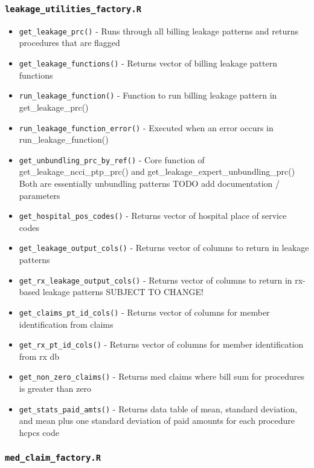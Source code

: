 \documentclass[
]{book}
\providecommand{\tightlist}{%
  \setlength{\itemsep}{0pt}\setlength{\parskip}{0pt}}
\begin{document}
\hypertarget{leakage_utilities_factory.r}{%
\subsubsection{\texorpdfstring{\texttt{leakage\_utilities\_factory.R}}{leakage\_utilities\_factory.R}}\label{leakage_utilities_factory.r}}

\begin{itemize}
\tightlist
\item
  \texttt{get\_leakage\_prc()} - Runs through all billing leakage patterns and returns procedures that are flagged
\item
  \texttt{get\_leakage\_functions()} - Returns vector of billing leakage pattern functions
\item
  \texttt{run\_leakage\_function()} - Function to run billing leakage pattern in get\_leakage\_prc()
\item
  \texttt{run\_leakage\_function\_error()} - Executed when an error occurs in run\_leakage\_function()
\item
  \texttt{get\_unbundling\_prc\_by\_ref()} - Core function of get\_leakage\_ncci\_ptp\_prc() and get\_leakage\_expert\_unbundling\_prc() Both are essentially unbundling patterns TODO add documentation / parameters
\item
  \texttt{get\_hospital\_pos\_codes()} - Returns vector of hospital place of service codes
\item
  \texttt{get\_leakage\_output\_cols()} - Returns vector of columns to return in leakage patterns
\item
  \texttt{get\_rx\_leakage\_output\_cols()} - Returns vector of columns to return in rx-based leakage patterns SUBJECT TO CHANGE!
\item
  \texttt{get\_claims\_pt\_id\_cols()} - Returns vector of columns for member identification from claims
\item
  \texttt{get\_rx\_pt\_id\_cols()} - Returns vector of columns for member identification from rx db
\item
  \texttt{get\_non\_zero\_claims()} - Returns med claims where bill sum for procedures is greater than zero
\item
  \texttt{get\_stats\_paid\_amts()} - Returns data table of mean, standard deviation, and mean plus one standard deviation of paid amounts for each procedure hcpcs code
\end{itemize}

\hypertarget{med_claim_factory.r}{%
\subsubsection{\texorpdfstring{\texttt{med\_claim\_factory.R}}{med\_claim\_factory.R}}\label{med_claim_factory.r}}
\end{document}
